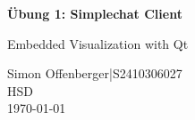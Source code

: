 \documentclass[11pt,a4paper,parskip=half]{scrartcl}
\newcommand{\Autor}{Simon Offenberger}
\newcommand{\Matrikelnummer}{S2410306027}
\newcommand{\Studiengang}{HSD}
\newcommand{\Abgabedatum}{\today}
\begin{document}
\hypersetup{pageanchor=false}

\setcounter{page}{1}
\hypersetup{pageanchor=true}
\begin{center}
  {\LARGE\bfseries Übung 1: Simplechat Client\par}
  \medskip
  {\large Embedded Visualization with Qt\par}
  \bigskip
  \Autor\quad |\quad \Matrikelnummer\\
  \Studiengang\\
  \Abgabedatum
\end{center}
\tableofcontents
\clearpage

\clearpage
\appendix

\end{document}
